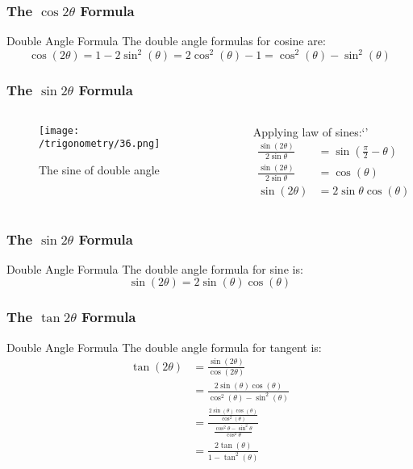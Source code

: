 \documentclass{beamer}
\begin{document}
\begin{frame}
    \frametitle{The \(\cos 2\theta\) Formula}
    \begin{block}{Double Angle Formula}
        The double angle formulas for cosine are:
        \[
        \cos(2\theta)  = 1 - 2\sin^2(\theta) = 2\cos^2(\theta) - 1= \cos^2(\theta) - \sin^2(\theta)
        \]
    \end{block}
\end{frame}


\begin{frame}
    \frametitle{The \(\sin 2\theta\) Formula}
    \begin{columns}
        \begin{column}{0.5\textwidth}
            \begin{figure}
                \centering
                \texttt{[image: /trigonometry/36.png]}
                \caption{The sine of double angle}
            \end{figure}
        \end{column}
        \begin{column}{0.5\textwidth}
            Applying law of sines:`'
            \begin{align}
                \frac{\sin(2\theta)}{2\sin \theta} &= \sin(\frac{\pi}{2} - \theta) \\
                \frac{\sin(2\theta)}{2\sin \theta} &= \cos(\theta) \\
                \sin(2\theta) &= 2\sin \theta \cos(\theta)
            \end{align}
        \end{column}
    \end{columns}
\end{frame}

\begin{frame}
    \frametitle{The \(\sin 2\theta\) Formula}
    \begin{block}{Double Angle Formula}
        The double angle formula for sine is:
        \[
        \sin(2\theta) = 2\sin(\theta)\cos(\theta)
        \]
    \end{block}
\end{frame}

\begin{frame}
    \frametitle{The \(\tan 2\theta\) Formula}
    \begin{block}{Double Angle Formula}
        The double angle formula for tangent is:
        \begin{align}
            \tan(2\theta) &= \frac{\sin(2\theta)}{\cos(2\theta)} \\
            &= \frac{2\sin(\theta)\cos(\theta)}{\cos^2(\theta) - \sin^2(\theta)} \\
            &=\frac{\frac{2\sin(\theta)\cos(\theta)}{\cos^{2}(\theta)}}{\frac{\cos^{2}\theta - \sin^2\theta}{\cos^2 \theta}} \\
            &= \frac{2\tan(\theta)}{1 - \tan^2(\theta)}
        \end{align}
    \end{block}
\end{frame}
\end{document}
